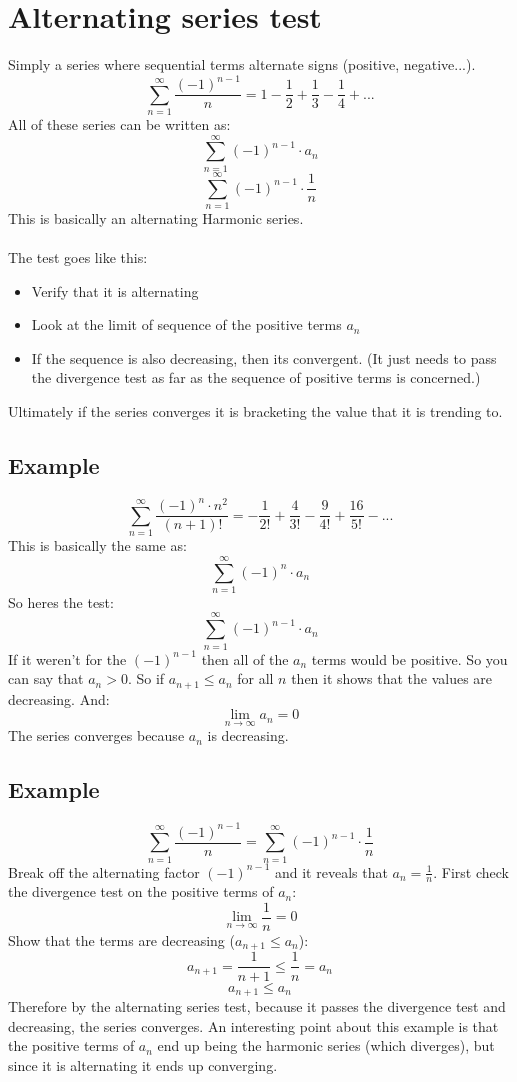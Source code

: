 \documentclass{article}
\begin{document}
\section{Alternating series test}
    Simply a series where sequential terms alternate signs (positive, negative...). 
    \[\sum_{n = 1}^{\infty} \frac{(-1)^{n-1}}{n} = 1 - \frac{1}{2} + \frac{1}{3} - \frac{1}{4} + ... \]
    All of these series can be written as:
    \[\sum_{n = 1}^{\infty}  (-1)^{n-1} \cdot a_n\]
    \[\sum_{n = 1}^{\infty} (-1)^{n-1} \cdot \frac{1}{n}\]
    This is basically an alternating Harmonic series.\\
    \\
    The test goes like this:
    \begin{itemize}
        \item Verify that it is alternating
        \item Look at the limit of sequence of the positive terms \(a_n\)
        \item If the sequence is also decreasing, then its convergent. (It just needs to pass the divergence test as far as the sequence of positive terms is concerned.)
    \end{itemize}
    Ultimately if the series converges it is bracketing the value that it is trending to.
    \subsection{Example}
        \[\sum_{n = 1}^{\infty}  \frac{(-1)^n \cdot n^2}{(n+1)!} = -\frac{1}{2!} + \frac{4}{3!} - \frac{9}{4!} + \frac{16}{5!} - ... \]
        This is basically the same as:
        \[\sum_{n = 1}^{\infty} (-1)^n \cdot a_n \]
        So heres the test:
        \[\sum_{n = 1}^{\infty} (-1)^{n-1} \cdot a_n \]
        If it weren't for the \((-1)^{n-1}\) then all of the \(a_n\) terms would be positive. So you can say that \(a_n > 0\).
        So if \(a_{n+1} \leq a_n\) for all \(n\) then it shows that the values are decreasing. And:
        \[\lim_{n \to \infty} a_n  = 0\]
        The series converges because \(a_n\) is decreasing.
    
    \subsection{Example}
        \[\sum_{n = 1}^{\infty} \frac{(-1)^{n-1}}{n} = \sum_{n = 1}^{\infty} (-1)^{n-1} \cdot \frac{1}{n}\]
        Break off the alternating factor \((-1)^{n-1}\) and it reveals that \(a_n = \frac{1}{n}\). 
        First check the divergence test on the positive terms of \(a_n\):
        \[\lim_{n \to \infty} \frac{1}{n} = 0\]
        Show that the terms are decreasing (\(a_{n+1} \leq a_n\)):
        \[a_{n+1} = \frac{1}{n+1} \leq \frac{1}{n} = a_n\]
        \[a_{n+1} \leq a_n\]
        Therefore by the alternating series test, because it passes the divergence test and decreasing, the series converges.
        An interesting point about this example is that the positive terms of \(a_n\) end up being the harmonic series (which diverges), but since it is alternating it ends up converging.
        
\end{document}
